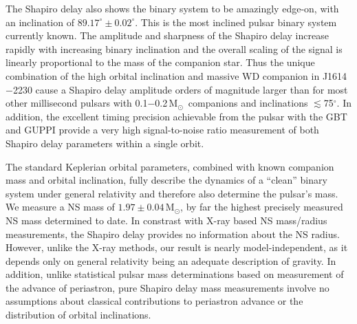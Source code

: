 \documentclass[12pt]{article}
\newcommand{\msun}{M$_\odot$}
\begin{document}
The Shapiro delay also shows the binary system to be amazingly edge-on,
with an inclination of $89.17^\circ \pm 0.02^\circ$.  This is the most
inclined pulsar binary system currently known. The amplitude and
sharpness of the Shapiro delay increase rapidly with increasing binary
inclination and the overall scaling of the signal is linearly
proportional to the mass of the companion star.  Thus the unique
combination of the high orbital inclination and massive WD companion in
J1614$-$2230 cause a Shapiro delay amplitude orders of magnitude larger
than for most other millisecond pulsars with 0.1$-$0.2\,\msun~companions
and inclinations $\lesssim$75$^\circ$.  In addition, the excellent
timing precision achievable from the pulsar with the GBT and GUPPI
provide a very high signal-to-noise ratio measurement of both Shapiro
delay parameters within a single orbit.

The standard Keplerian orbital parameters, combined with known companion
mass and orbital inclination, fully describe the dynamics of a ``clean''
binary system under general relativity and therefore also determine the
pulsar's mass.  We measure a NS mass of $1.97 \pm 0.04$\,\msun, by far
the highest precisely measured NS mass determined to date.  In constrast
with X-ray based NS mass/radius measurements\cite{ozel06}, the Shapiro
delay provides no information about the NS radius.  However, unlike the
X-ray methods, our result is nearly model-independent, as it depends
only on general relativity being an adequate description of gravity.  In
addition, unlike statistical pulsar mass determinations based on
measurement of the advance of periastron\cite{rhs+05,frb+08,fwb+08},
pure Shapiro delay mass measurements involve no assumptions about
classical contributions to periastron advance or the distribution of
orbital inclinations.  
\end{document}
